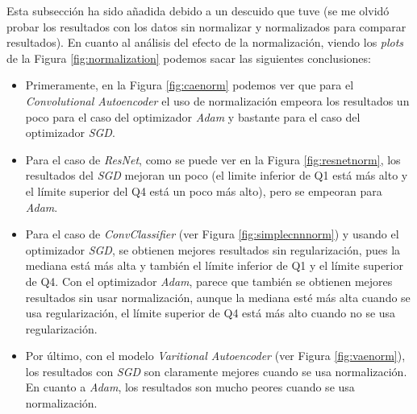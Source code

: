 Esta subsección ha sido añadida debido a un descuido que tuve (se me olvidó probar los resultados con los datos sin normalizar y normalizados para comparar resultados). En cuanto al análisis del efecto de la normalización, viendo los \textit{plots} de la Figura \ref{fig:normalization} podemos sacar las siguientes conclusiones:

\begin{itemize}
    \item Primeramente, en la Figura \ref{fig:caenorm} podemos ver que para el \textit{Convolutional Autoencoder} el uso de normalización empeora los resultados un poco para el caso del optimizador \textit{Adam} y bastante para el caso del optimizador \textit{SGD}.
    \item Para el caso de \textit{ResNet}, como se puede ver en la Figura \ref{fig:resnetnorm}, los resultados del \textit{SGD} mejoran un poco (el limite inferior de Q1 está más alto y el límite superior del Q4 está un poco más alto), pero se empeoran para \textit{Adam}.
    \item Para el caso de \textit{ConvClassifier} (ver Figura \ref{fig:simplecnnnorm}) y usando el optimizador \textit{SGD}, se obtienen mejores resultados sin regularización, pues la mediana está más alta y también el límite inferior de Q1 y el límite superior de Q4. Con el optimizador \textit{Adam}, parece que también se obtienen mejores resultados sin usar normalización, aunque la mediana esté más alta cuando se usa regularización, el límite superior de Q4 está más alto cuando no se usa regularización.
    \item Por último, con el modelo \textit{Varitional Autoencoder} (ver Figura \ref{fig:vaenorm}), los resultados con \textit{SGD} son claramente mejores cuando se usa normalización. En cuanto a \textit{Adam}, los resultados son mucho peores cuando se usa normalización.
\end{itemize}

